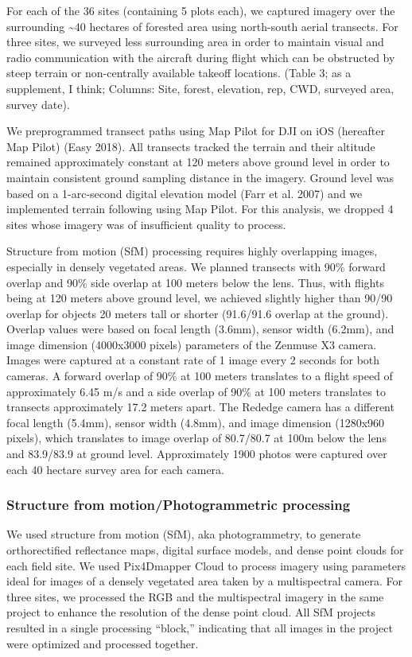 \documentclass[]{article}
\begin{document}
For each of the 36 sites (containing 5 plots each), we captured imagery
over the surrounding \textasciitilde{}40 hectares of forested area using
north-south aerial transects. For three sites, we surveyed less
surrounding area in order to maintain visual and radio communication
with the aircraft during flight which can be obstructed by steep terrain
or non-centrally available takeoff locations. (Table 3; as a supplement,
I think; Columns: Site, forest, elevation, rep, CWD, surveyed area,
survey date).

We preprogrammed transect paths using Map Pilot for DJI on iOS
(hereafter Map Pilot) (Easy 2018). All transects tracked the terrain and
their altitude remained approximately constant at 120 meters above
ground level in order to maintain consistent ground sampling distance in
the imagery. Ground level was based on a 1-arc-second digital elevation
model (Farr et al. 2007) and we implemented terrain following using Map
Pilot. For this analysis, we dropped 4 sites whose imagery was of
insufficient quality to process.

Structure from motion (SfM) processing requires highly overlapping
images, especially in densely vegetated areas. We planned transects with
90\% forward overlap and 90\% side overlap at 100 meters below the lens.
Thus, with flights being at 120 meters above ground level, we achieved
slightly higher than 90/90 overlap for objects 20 meters tall or shorter
(91.6/91.6 overlap at the ground). Overlap values were based on focal
length (3.6mm), sensor width (6.2mm), and image dimension (4000x3000
pixels) parameters of the Zenmuse X3 camera. Images were captured at a
constant rate of 1 image every 2 seconds for both cameras. A forward
overlap of 90\% at 100 meters translates to a flight speed of
approximately 6.45 m/s and a side overlap of 90\% at 100 meters
translates to transects approximately 17.2 meters apart. The Rededge
camera has a different focal length (5.4mm), sensor width (4.8mm), and
image dimension (1280x960 pixels), which translates to image overlap of
80.7/80.7 at 100m below the lens and 83.9/83.9 at ground level.
Approximately 1900 photos were captured over each 40 hectare survey area
for each camera.

\subsubsection{Structure from motion/Photogrammetric
processing}\label{structure-from-motionphotogrammetric-processing}

We used structure from motion (SfM), aka photogrammetry, to generate
orthorectified reflectance maps, digital surface models, and dense point
clouds for each field site. We used Pix4Dmapper Cloud to process imagery
using parameters ideal for images of a densely vegetated area taken by a
multispectral camera. For three sites, we processed the RGB and the
multispectral imagery in the same project to enhance the resolution of
the dense point cloud. All SfM projects resulted in a single processing
``block,'' indicating that all images in the project were optimized and
processed together.
\end{document}
